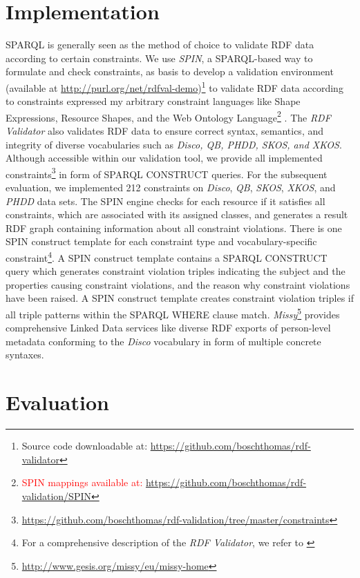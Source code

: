 \documentclass{llncs}
\begin{document}
{\section{Implementation}
\label{implementation}

SPARQL is generally seen as the method of choice to validate RDF data according to certain constraints.
We use \emph{SPIN}, 
a SPARQL-based way to formulate and check constraints, as basis to develop a
validation environment (available at \url{http://purl.org/net/rdfval-demo})\footnote{Source code downloadable at: \textcolor{red}{\url{https://github.com/boschthomas/rdf-validator}}} to validate RDF data according to constraints expressed my arbitrary constraint languages like Shape Expressions,
Resource Shapes, and the Web Ontology Language\footnote{\textcolor{red}{SPIN mappings available at: \url{https://github.com/boschthomas/rdf-validation/SPIN}}} \cite{BoschEckert2014-2}.
The \emph{RDF Validator} also validates RDF data to ensure correct syntax, semantics, and integrity of diverse vocabularies such as \emph{Disco, QB, PHDD, SKOS, and XKOS}.
Although accessible within our validation tool, we provide all implemented constraints\footnote{\url{https://github.com/boschthomas/rdf-validation/tree/master/constraints}} in form of SPARQL CONSTRUCT queries.
For the subsequent evaluation, we implemented 212 constraints on \emph{Disco}, \emph{QB}, \emph{SKOS}, \emph{XKOS}, and \emph{PHDD} data sets.
The SPIN engine checks for each resource if it satisfies all constraints, which are associated with its assigned classes, and generates a result RDF graph containing information about all constraint violations.
There is one SPIN construct template for each constraint type and vocabulary-specific constraint\footnote{For a comprehensive description of the \emph{RDF Validator}, we refer to \cite{BoschEckert2014-2}}.
A SPIN construct template contains a SPARQL CONSTRUCT query which generates constraint violation triples indicating the subject and the properties causing constraint violations, and the reason why constraint violations have been raised.
A SPIN construct template creates constraint violation triples if all triple patterns within the SPARQL WHERE clause match.
\emph{Missy}\footnote{\url{http://www.gesis.org/missy/eu/missy-home}} provides comprehensive Linked Data services like diverse RDF exports of person-level metadata conforming to the \emph{Disco} vocabulary in form of multiple concrete syntaxes. 

\section{Evaluation}
\label{evaluation}

}
\end{document}
